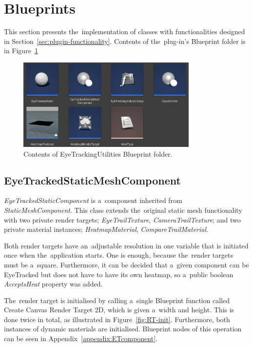 \section{Blueprints}

This section presents the~implementation of classes with functionalities designed in Section~\ref{sec:plugin-functionality}. Contents of the~plug-in's Blueprint folder is in Figure~\ref{fig:blueprint-folder} 

\begin{figure}[!ht]\centering
    \includegraphics[width=0.8\textwidth]{img/plugin-blueprints.png}
    \caption{Contents of EyeTrackingUtilities Blueprint folder.}
    \label{fig:blueprint-folder}
\end{figure}

\subsection{EyeTrackedStaticMeshComponent}
\label{sec:static-mesh-ET}

\emph{EyeTrackedStaticComponent} is a~component inherited from \emph{StaticMeshComponent}. This class extends the~original static mesh functionality with two private render targets; \emph{EyeTrailTexture}, \emph{CameraTrailTexture}; and two private material instances; \emph{HeatmapMaterial}, \emph{CompareTrailMaterial}.

Both render targets have an~adjustable resolution in one variable that is initiated once when the~application starts. One is enough, because the~render targets must be a~square. Furthermore, it can be decided that a~given component can be EyeTracked but does not have to have its own heatmap, so a~public boolean \emph{AcceptsHeat} property was added.

The~render target is initialised by calling a~single Blueprint function called Create Canvas Render Target 2D, which is given a~width and height. This is done twice in total, as illustrated in Figure~\ref{fig:RT-init}. Furthermore, both instances of dynamic materials are initialised. Blueprint nodes of this operation can be seen in Appendix~\ref{appendix:ETcomponent}.

